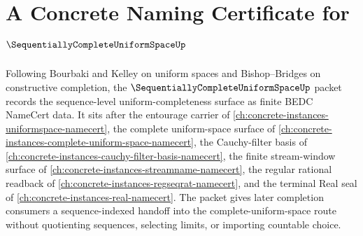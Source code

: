 \chapter{A Concrete Naming Certificate for $\SequentiallyCompleteUniformSpaceUp$}
\label{ch:concrete-instances-sequentially-complete-uniform-space-namecert}

Following Bourbaki and Kelley on uniform spaces and Bishop--Bridges on constructive completion, the $\SequentiallyCompleteUniformSpaceUp$ packet records the sequence-level uniform-completeness surface as finite BEDC NameCert data. It sits after the entourage carrier of \autoref{ch:concrete-instances-uniformspace-namecert}, the complete uniform-space surface of \autoref{ch:concrete-instances-complete-uniform-space-namecert}, the Cauchy-filter basis of \autoref{ch:concrete-instances-cauchy-filter-basis-namecert}, the finite stream-window surface of \autoref{ch:concrete-instances-streamname-namecert}, the regular rational readback of \autoref{ch:concrete-instances-regseqrat-namecert}, and the terminal Real seal of \autoref{ch:concrete-instances-real-namecert}. The packet gives later completion consumers a sequence-indexed handoff into the complete-uniform-space route without quotienting sequences, selecting limits, or importing countable choice.

